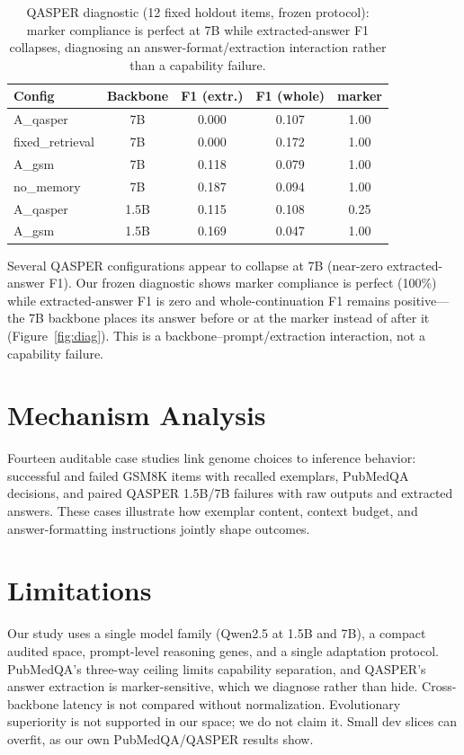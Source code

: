\documentclass[11pt]{article}
\begin{document}
\begin{table}[t]
\centering\small
\begin{tabular}{@{}lcccc@{}}
\toprule
Config & Backbone & F1 (extr.) & F1 (whole) & marker \\
\midrule
A\_qasper & 7B & 0.000 & 0.107 & 1.00 \\
fixed\_retrieval & 7B & 0.000 & 0.172 & 1.00 \\
A\_gsm & 7B & 0.118 & 0.079 & 1.00 \\
no\_memory & 7B & 0.187 & 0.094 & 1.00 \\
\midrule
A\_qasper & 1.5B & 0.115 & 0.108 & 0.25 \\
A\_gsm & 1.5B & 0.169 & 0.047 & 1.00 \\
\bottomrule
\end{tabular}
\caption{QASPER diagnostic (12 fixed holdout items, frozen protocol):
marker compliance is perfect at 7B while extracted-answer F1 collapses,
diagnosing an answer-format/extraction interaction rather than a capability
failure.}
\label{tab:diag}
\end{table}

Several QASPER configurations appear to collapse at 7B (near-zero
extracted-answer F1). Our frozen diagnostic shows marker compliance is
perfect (100\%) while extracted-answer F1 is zero and whole-continuation F1
remains positive---the 7B backbone places its answer before or at the marker
instead of after it (Figure~\ref{fig:diag}). This is a
backbone--prompt/extraction interaction, not a capability failure.

\section{Mechanism Analysis}

Fourteen auditable case studies link genome choices to inference behavior:
successful and failed GSM8K items with recalled exemplars, PubMedQA
decisions, and paired QASPER 1.5B/7B failures with raw outputs and extracted
answers. These cases illustrate how exemplar content, context budget, and
answer-formatting instructions jointly shape outcomes.

\section{Limitations}

Our study uses a single model family (Qwen2.5 at 1.5B and 7B), a compact
audited space, prompt-level reasoning genes, and a single adaptation
protocol. PubMedQA's three-way ceiling limits capability separation, and
QASPER's answer extraction is marker-sensitive, which we diagnose rather
than hide. Cross-backbone latency is not compared without normalization.
Evolutionary superiority is not supported in our space; we do not claim it.
Small dev slices can overfit, as our own PubMedQA/QASPER results show.
\end{document}
